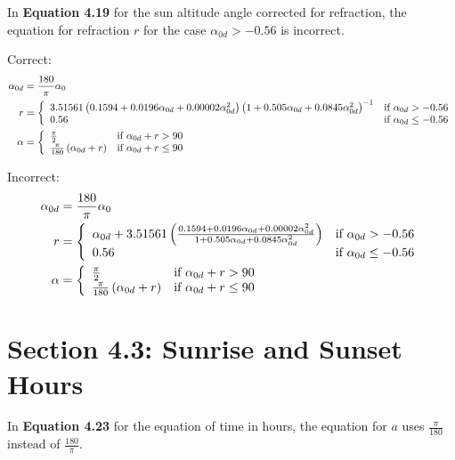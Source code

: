 \documentclass[report]{nrel}
\begin{document}
In \textbf{Equation 4.19} for the sun altitude angle corrected for refraction, the equation for refraction $r$ for the case $\alpha_{0d} > -0.56$ is incorrect.

Correct:
\begin{align*}\label{eqn-elvcorr}
\alpha_{0d} &= \frac{180}{\pi}\alpha_0\notag\\
r &= \left\{
\begin{array}{ll}
3.51561\left(0.1594 + 0.0196\alpha_{0d} + 0.00002\alpha_{0d}^2\right) \left(1 + 0.505\alpha_{0d} + 0.0845\alpha_{0d}^2\right)^{-1} & \text{if $\alpha_{0d}>-0.56$}\\
0.56 & \text{if $\alpha_{0d} \leq -0.56$}
\end{array}
\right.\notag\\
\alpha & = \left\{
\begin{array}{ll}
\frac{\pi}{2} & \text{if $\alpha_{0d} + r > 90$}\\
\frac{\pi}{180}\left(\alpha_{0d} + r\right) & \text{if $\alpha_{0d} + r \leq 90$}
\end{array}
\right.
\end{align*}

Incorrect:
\begin{align*}
\alpha_{0d} &= \frac{180}{\pi}\alpha_0\notag\\
r &= \left\{
\begin{array}{ll}
\alpha_{0d} + 3.51561\left(\frac{0.1594 + 0.0196\alpha_{0d} + 0.00002\alpha_{0d}^2}{1 + 0.505\alpha_{0d} + 0.0845\alpha_{0d}^2}\right) & \text{if $\alpha_{0d}>-0.56$}\\
0.56 & \text{if $\alpha_{0d} \leq -0.56$}
\end{array}
\right.\notag\\
\alpha & = \left\{
\begin{array}{ll}
\frac{\pi}{2} & \text{if $\alpha_{0d} + r > 90$}\\
\frac{\pi}{180}\left(\alpha_{0d} + r\right) & \text{if $\alpha_{0d} + r \leq 90$}
\end{array}
\right.
\end{align*}

\section*{Section 4.3: Sunrise and Sunset Hours}

In \textbf{Equation 4.23} for the equation of time in hours, the equation for $a$ uses $\frac{\pi}{180}$ instead of $\frac{180}{\pi}$.
\end{document}
